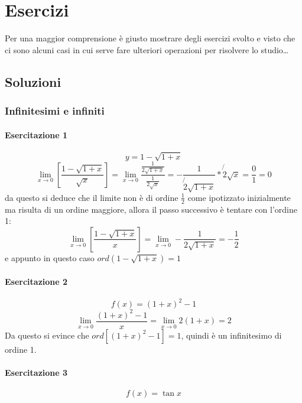 \part{Esercizi}
Per una maggior comprensione è giusto mostrare degli esercizi svolto e visto che ci sono alcuni casi in cui serve fare ulteriori operazioni per risolvere lo studio\dots

\chapter{Soluzioni}
\section {Infinitesimi e infiniti}
\subsection{Esercitazione 1}
\begin{equation}
	y=1-\sqrt{1+x}
\end{equation}
\begin{equation*}
	\lim_{x\to0}\left[\frac{1-\sqrt{1+x}}{\sqrt{x}}\right]=\lim_{x\to0}\frac{\frac{1}{2\sqrt{1+x}}}{\frac{1}{2\sqrt{x}}}=-\frac{1}{\not{2}\sqrt{1+x}}*\not{2}\sqrt{x}=\frac{0}{1}=0
\end{equation*}
da questo si deduce che il limite non è di ordine $\frac{1}{2}$ come ipotizzato inizialmente ma risulta di un ordine maggiore, allora il passo successivo è tentare con l'ordine 1:
\begin{equation*}
	\lim_{x\to0}\left[\frac{1-\sqrt{1+x}}{x}\right]=\lim_{x\to0}-\frac{1}{2\sqrt{1+x}}=-\frac{1}{2}
\end{equation*}
e appunto in questo caso $ord\left(1-\sqrt{1+x}\right)=1$
\subsection{Esercitazione 2}
\begin{equation}
	f(x)=(1+x)^2-1
\end{equation}
\begin{equation*}
	\lim_{x\to0}\frac{(1+x)^2-1}{x}=\lim_{x\to0}2(1+x)=2
\end{equation*}
Da questo si evince che $ord\left[(1+x)^2-1\right]=1$, quindi è un infinitesimo di ordine 1.
\subsection{Esercitazione 3}
\begin{equation}
	f(x)=\tan x
\end{equation}
